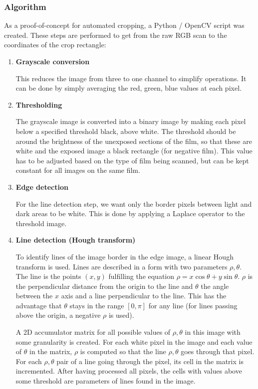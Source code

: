 \documentclass{article}
\begin{document}
\subsubsection{Algorithm}

As a proof-of-concept for automated cropping, a Python / OpenCV \cite{opencv}
script was created. These steps are performed to get from the raw RGB scan
to the coordinates of the crop rectangle:

\begin{enumerate}
\item {\bf Grayscale conversion}

This reduces the image from three to one channel
to simplify operations. It can be done by simply averaging the red, green, blue values at
each pixel.

\item {\bf Thresholding}

The grayscale image is converted into a binary image
by making each pixel below a specified threshold black, above white. The threshold
should be around the brightness of the unexposed sections of the film, so that these
are white and the exposed image a black rectangle (for negative film). This value
has to be adjusted based on the type of film being scanned, but can be kept constant
for all images on the same film.

\item {\bf Edge detection}

For the line detection step, we want only the border
pixels between light and dark areas to be white. This is done by applying a
Laplace operator \cite{opencv_gradient} to the threshold image.

\item {\bf Line detection (Hough transform)}

To identify lines of the image border
in the edge image, a linear Hough transform \cite{houghtransform} is used. Lines are described
in a form with two parameters $\rho, \theta$. The line is the points $(x, y)$
fulfilling the equation $\rho = x \cos \theta + y \sin \theta$. $\rho$ is the
perpendicular distance from the origin to the line and $\theta$ the angle
between the $x$ axis and a line perpendicular to the line. This has the
advantage that $\theta$ stays in the range $[0, \pi]$ for any line (for lines passing
above the origin, a negative $\rho$ is used).

A 2D accumulator matrix for all possible values of $\rho, \theta$ in this image with some
granularity is created. For each white pixel in the image and each value of $\theta$ in the
matrix, $\rho$ is computed so that the line $\rho, \theta$ goes through that pixel.
For each $\rho, \theta$ pair of a line going through the pixel, its cell in the matrix
is incremented. After having processed all pixels, the cells with values above some
threshold are parameters of lines found in the image.


\end{enumerate}
\end{document}
